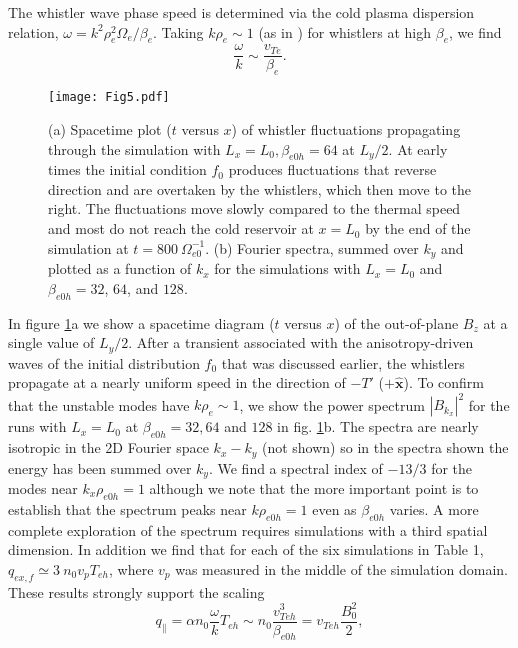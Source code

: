 \documentclass[%
 reprint,
superscriptaddress,
 amsmath,amssymb,
 aps,
]{revtex4-1}
\begin{document}
The whistler wave phase speed is determined via the cold plasma dispersion relation, $\omega = k^{2}\rho_{e}^2 \Omega_{e}/\beta_{e}$. Taking $k \rho_{e} \sim 1$ (as in \cite{Roberg-Clark2016}) for whistlers at high $\beta_{e}$, we find
\begin{equation} \label{eqn:2}
\frac{\omega}{k} \sim \frac{v_{Te}}{\beta_{e}}.
\end{equation}
\begin{figure}
    \centering
    \texttt{[image: Fig5.pdf]}
    \caption{(a) Spacetime plot ($t$ versus $x$) of whistler fluctuations propagating through the simulation with $L_{x}=L_{0},\beta_{e0h}=64$ at $L_{y}/2$. At early times the initial condition $f_{0}$ produces fluctuations that reverse direction and are overtaken by the whistlers, which then move to the right. The fluctuations move slowly compared to the thermal speed and most do not reach the cold reservoir at $x=L_{0}$ by the end of the simulation at $t=800 \: \Omega_{e0}^{-1}$. (b) Fourier spectra, summed over $k_{y}$ and plotted as a function of $k_{x}$ for the simulations with $L_{x}=L_{0}$ and $\beta_{e0h}=32$, $64$, and $128$.}
    \label{fig:5}
\end{figure}
In figure \ref{fig:5}a we show a spacetime diagram ($t$ versus $x$) of
the out-of-plane $B_{z}$ at a single value of $L_{y}/2$. After a
transient associated with the anisotropy-driven waves of the initial
distribution $f_{0}$ that was discussed earlier, the whistlers
propagate at a nearly uniform speed in the direction of $-T'$
($+\mathbf{\hat{x}}$). To confirm that the unstable modes have $k
\rho_{e} \sim 1$, we show the power spectrum $|B_{k_x}|^{2}$ for the
runs with $L_{x}=L_{0}$ at $\beta_{e0h}=32,64$ and $128$ in
fig. \ref{fig:5}b. The spectra are nearly isotropic in the 2D Fourier
space $k_x-k_y$ (not shown) so in the spectra shown the energy has
been summed over $k_{y}$. We find a spectral index of $-13/3$ for the
modes near $k_x\rho_{e0h}=1$ although we note that the more important
point is to establish that the spectrum peaks near $k
\rho_{e0h}=1$ even as $\beta_{e0h}$ varies. A more complete exploration
of the spectrum requires simulations with a third spatial
dimension. In addition we find that for each of the six simulations in
Table 1, $q_{ex,f} \simeq 3 \: n_0 v_{p} T_{eh}$, where $v_{p}$ was
measured in the middle of the simulation domain. These results
strongly support the scaling
\begin{equation} \label{eqn:3}
    q_{\parallel} = \alpha n_{0} \frac{\omega}{k} T_{eh} \sim n_{0} \frac{v_{Teh}^{3}}{\beta_{e0h}} = v_{Teh} \frac{B_{0}^2}{2},
\end{equation}
\end{document}
